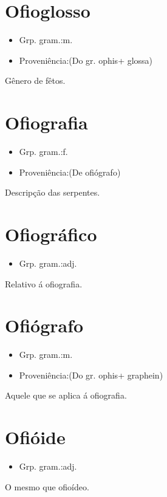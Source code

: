 \section{Ofioglosso}
\begin{itemize}
\item {Grp. gram.:m.}
\end{itemize}
\begin{itemize}
\item {Proveniência:(Do gr. \textunderscore ophis\textunderscore  + \textunderscore glossa\textunderscore )}
\end{itemize}
Gênero de fêtos.
\section{Ofiografia}
\begin{itemize}
\item {Grp. gram.:f.}
\end{itemize}
\begin{itemize}
\item {Proveniência:(De \textunderscore ofiógrafo\textunderscore )}
\end{itemize}
Descripção das serpentes.
\section{Ofiográfico}
\begin{itemize}
\item {Grp. gram.:adj.}
\end{itemize}
Relativo á ofiografia.
\section{Ofiógrafo}
\begin{itemize}
\item {Grp. gram.:m.}
\end{itemize}
\begin{itemize}
\item {Proveniência:(Do gr. \textunderscore ophis\textunderscore  + \textunderscore graphein\textunderscore )}
\end{itemize}
Aquele que se aplica á ofiografia.
\section{Ofióide}
\begin{itemize}
\item {Grp. gram.:adj.}
\end{itemize}
O mesmo que \textunderscore ofioídeo\textunderscore .
